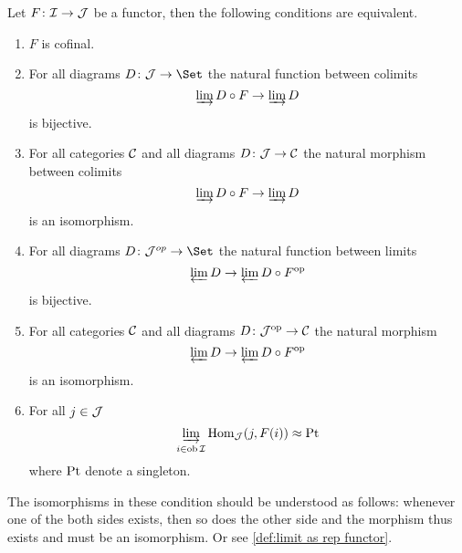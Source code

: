 \begin{thm}\label{thm:cofinal}
Let $F\colon{\cal I}\to{\cal J}$ be a functor, then the following conditions are equivalent.
  \begin{enumerate}
    \item $F$ is cofinal.
    \item For all diagrams $D\colon\Jj\to\Set$ the natural function between colimits
          \begin{equation*}
              \operatorname*{\underrightarrow{\lim}} D \circ F \to \operatorname*{\underrightarrow{\lim}} D
          \end{equation*}
          is bijective.
    \item For all categories ${\cal C}$ and all diagrams $D\colon{\cal J}\to{\cal C}$ the natural morphism between colimits
          \begin{equation*}
              \operatorname*{\underrightarrow{\lim}} D \circ F \to \operatorname*{\underrightarrow{\lim}} D
          \end{equation*}
          is an isomorphism.
    \item For all diagrams $D\colon\Jj^{op}\to\Set$ the natural function between limits
          \begin{equation*}
              \operatorname*{\underleftarrow{\lim}} D \to \operatorname*{\underleftarrow{\lim}} D \circ F^{\operatorname{op}}
          \end{equation*}
          is bijective.
    \item For all categories ${\cal C}$ and all diagrams $D\colon{\cal J}^{\operatorname{op}}\to{\cal C}$ the natural morphism
          \begin{equation*}
              \operatorname*{\underleftarrow{\lim}} D \to \operatorname*{\underleftarrow{\lim}} D \circ F^{\operatorname{op}}
          \end{equation*}
          is an isomorphism.
    \item For all $j \in {\cal J}$
          \begin{equation*}
              \operatorname*{\underrightarrow{\lim}}_{i\in\operatorname{ob}{\cal I}} \operatorname{Hom}_{{\cal J}}(j,F(i))\approx\operatorname{Pt}
          \end{equation*}
          where $\operatorname{Pt}$ denote a singleton.
\end{enumerate}
\end{thm}
\begin{rem}
  The isomorphisms in these condition should be understood as follows: whenever one of the both sides exists, then so does the other side and the morphism thus exists and must be an isomorphism. Or see \ref{def:limit as rep functor}.
\end{rem}



